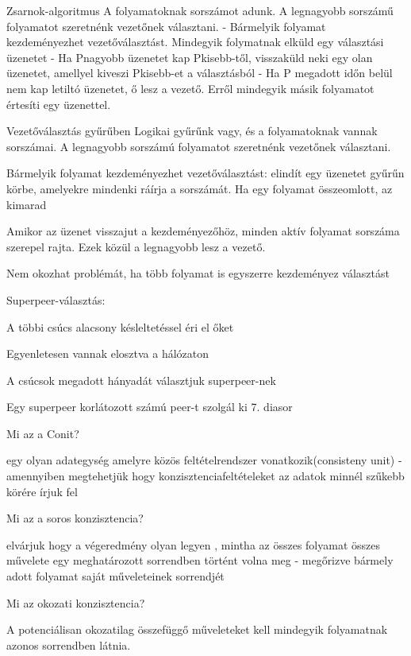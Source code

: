 \documentclass[12pt]{article}
\begin{document}
\begin{description}[style=unboxed]
    \item  Zsarnok-algoritmus
        A folyamatoknak sorszámot adunk. A legnagyobb sorszámű folyamatot szeretnénk vezetőnek választani.
        - Bármelyik folyamat kezdeményezhet vezetőválasztást. Mindegyik folymatnak elküld egy választási üzenetet
        - Ha Pnagyobb üzenetet kap Pkisebb-től, visszaküld neki egy olan üzenetet, amellyel kiveszi Pkisebb-et a választásból
        - Ha P megadott időn belül nem kap letiltó üzenetet, ő lesz a vezető. Erről mindegyik másik folyamatot értesíti egy üzenettel.
    \item  Vezetőválasztás gyűrűben
        Logikai gyűrűnk vagy, és a folyamatoknak vannak sorszámai. A legnagyobb sorszámú folyamatot szeretnénk vezetőnek választani.
    \item Bármelyik folyamat kezdeményezhet vezetőválasztást: elindít egy üzenetet gyűrűn körbe, amelyekre mindenki ráírja a sorszámát.
        Ha egy folyamat összeomlott, az kimarad
    \item Amikor az üzenet visszajut a kezdeményezőhöz, minden aktív folyamat sorszáma szerepel rajta. Ezek közül a legnagyobb lesz a vezető.
    \item Nem okozhat problémát, ha több folyamat is egyszerre kezdeményez választást	
    \item  Superpeer-választás:
    \item A többi csúcs alacsony késleltetéssel éri el őket
    \item Egyenletesen vannak elosztva a hálózaton
    \item A csúcsok megadott hányadát választjuk superpeer-nek
    \item Egy superpeer korlátozott számú peer-t szolgál ki
        7. diasor
    \item  Mi az a Conit?
    \item egy olyan adategység amelyre közös feltételrendszer vonatkozik(consisteny unit)
        - amennyiben megtehetjük hogy konzisztenciafeltételeket az adatok minnél szűkebb körére írjuk fel
    \item  Mi az a soros konzisztencia?
    \item elvárjuk hogy a végeredmény olyan legyen , mintha az összes folyamat összes művelete
        egy meghatározott sorrendben történt volna meg
        - megőrizve bármely adott folyamat saját műveleteinek sorrendjét
    \item  Mi az okozati konzisztencia?
    \item A potenciálisan okozatilag összefüggő műveleteket kell mindegyik folyamatnak azonos sorrendben látnia.

\end{description}
\end{document}
